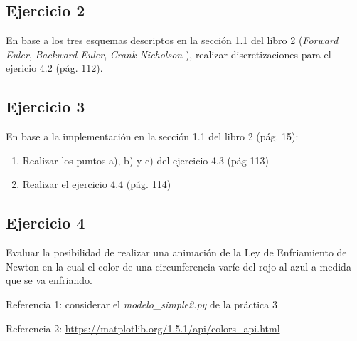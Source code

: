 \documentclass[a4paper]{article}
\begin{document}
\subsection{Ejercicio 2}
En base a los tres esquemas descriptos en la sección 1.1 del libro 2 
(\emph{Forward Euler}, \emph{Backward Euler}, \emph{Crank-Nicholson }), 
realizar discretizaciones para el ejericio 4.2 (pág. 112).

\subsection{Ejercicio 3}
En base a la implementación en la sección 1.1 del libro 2 (pág. 15):

\begin{enumerate}
	\item Realizar los puntos a), b) y c) del ejercicio 4.3 (pág 113)
	\item Realizar el ejercicio 4.4 (pág. 114)
\end{enumerate}
 
\subsection{Ejercicio 4}
Evaluar la posibilidad de realizar una animación de la Ley de 
Enfriamiento de Newton en la cual el color de una circunferencia varíe 
del rojo al azul a medida que se va enfriando.

\bigskip

Referencia 1: considerar el \emph{modelo\_simple2.py} de la práctica 3

\smallskip

Referencia 2: \url{https://matplotlib.org/1.5.1/api/colors_api.html}
\end{document}
